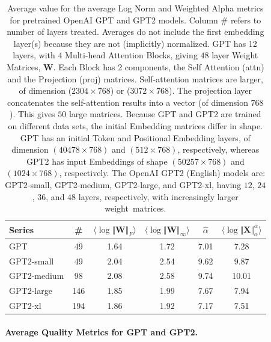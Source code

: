 \begin{table}[t]
\small
\begin{center}
\begin{tabular}{|p{1in}|c|c|c|c|c|}
\hline
 Series  & \#   & $\langle\log\Vert\mathbf{W}\Vert_{F}\rangle$ & $\langle\log\Vert\mathbf{W}\Vert_{\infty}\rangle$ & $\hat{\alpha}$ & $\langle\log\Vert\mathbf{X}\Vert^{\alpha}_{\alpha}\rangle$ \\
\hline
GPT & 49 & 1.64  & 1.72 & 7.01 & 7.28 \\
GPT2-small & 49 & 2.04  & 2.54& 9.62 & 9.87 \\
GPT2-medium & 98 & 2.08 & 2.58& 9.74 & 10.01 \\
GPT2-large & 146 & 1.85 & 1.99& 7.67 & 7.94 \\
GPT2-xl & 194 & 1.86 & 1.92 & 7.17 & 7.51 \\
\hline
\end{tabular}
\end{center}
\caption{Average value for the average Log Norm and Weighted Alpha metrics for pretrained OpenAI GPT and GPT2 models. 
Column \# refers to number of layers treated.  
Averages do not include the first embedding layer(s) because they are not (implicitly) normalized.  
GPT has 12 layers, with 4 Multi-head Attention Blocks, giving $48$ layer Weight Matrices, $\mathbf{W}$.
Each Block has 2 components, the Self Attention (attn) and the Projection (proj) matrices.  
Self-attention  matrices are larger, of dimension ($2304\times 768$) or ($3072\times 768$).
The projection layer concatenates the self-attention results into a vector (of dimension $768$).
This gives $50$ large matrices.
Because GPT and GPT2 are trained on different data sets, the initial Embedding matrices differ in shape.
GPT has an initial Token and Positional Embedding layers, of dimension $(40478\times 768)$ and $(512\times 768)$, respectively, whereas GPT2 has input Embeddings of shape $(50257\times 768)$ and $(1024\times 768)$, respectively. 
The OpenAI GPT2 (English) models are: GPT2-small, GPT2-medium, GPT2-large, and GPT2-xl, having $12$, $24$, $36$, and $48$ layers, respectively, with increasingly larger weight~matrices.
}
\label{table:nlp}
\end{table}


\paragraph{Average Quality Metrics for GPT and GPT2.}

